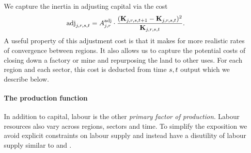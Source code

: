 \documentclass[12pt,a4paper,twoside, draft]{article}
\begin{document}
We capture the inertia in adjusting capital
via the cost
\begin{equation}
  \textup{adj}_{j, r, {s}, t}
    = A_{j, r} ^ \textup{adj} 
      \cdot \frac{(\mathbf{K}_{j, r, {s}, t + 1}
      - \mathbf{K}_{j, r, {s}, t})^2}
        {\mathbf{K}_{j, r, {s}, t}}.
\end{equation}
A useful property of this adjustment cost is that it makes for more realistic
rates of convergence between regions.
It also allows us to capture the potential costs of closing down a
factory or mine and repurposing the land to other uses.
For each region and each sector, this cost is deducted from time ${s}, t$
output which we describe below.
\paragraph{The production function}
In addition to capital, labour is the other \emph{primary factor of
production.}
Labour resources also vary across regions, sectors and time.
To simplify the exposition we avoid explicit constraints on labour supply and
instead have a disutility of labour supply similar to
\citet{Atalay-Sectoral_shocks} and \citet{CJ}.
\end{document}
